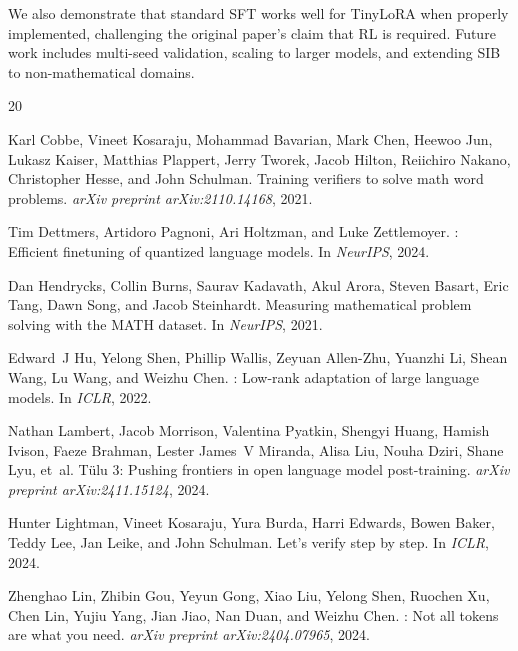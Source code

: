 \documentclass{article}
\begin{document}
We also demonstrate that standard SFT works well for TinyLoRA when properly implemented, challenging the original paper's claim that RL is required. Future work includes multi-seed validation, scaling to larger models, and extending SIB to non-mathematical domains.



\begin{thebibliography}{20}

Karl Cobbe, Vineet Kosaraju, Mohammad Bavarian, Mark Chen, Heewoo Jun, Lukasz Kaiser, Matthias Plappert, Jerry Tworek, Jacob Hilton, Reiichiro Nakano, Christopher Hesse, and John Schulman.
\newblock Training verifiers to solve math word problems.
\newblock \emph{arXiv preprint arXiv:2110.14168}, 2021.

Tim Dettmers, Artidoro Pagnoni, Ari Holtzman, and Luke Zettlemoyer.
: Efficient finetuning of quantized language models.
\newblock In \emph{NeurIPS}, 2024.

Dan Hendrycks, Collin Burns, Saurav Kadavath, Akul Arora, Steven Basart, Eric Tang, Dawn Song, and Jacob Steinhardt.
\newblock Measuring mathematical problem solving with the {MATH} dataset.
\newblock In \emph{NeurIPS}, 2021.

Edward~J Hu, Yelong Shen, Phillip Wallis, Zeyuan Allen-Zhu, Yuanzhi Li, Shean Wang, Lu Wang, and Weizhu Chen.
: Low-rank adaptation of large language models.
\newblock In \emph{ICLR}, 2022.

Nathan Lambert, Jacob Morrison, Valentina Pyatkin, Shengyi Huang, Hamish Ivison, Faeze Brahman, Lester James~V Miranda, Alisa Liu, Nouha Dziri, Shane Lyu, et~al.
\newblock T{\"u}lu 3: Pushing frontiers in open language model post-training.
\newblock \emph{arXiv preprint arXiv:2411.15124}, 2024.

Hunter Lightman, Vineet Kosaraju, Yura Burda, Harri Edwards, Bowen Baker, Teddy Lee, Jan Leike, and John Schulman.
\newblock Let's verify step by step.
\newblock In \emph{ICLR}, 2024.

Zhenghao Lin, Zhibin Gou, Yeyun Gong, Xiao Liu, Yelong Shen, Ruochen Xu, Chen Lin, Yujiu Yang, Jian Jiao, Nan Duan, and Weizhu Chen.
: Not all tokens are what you need.
\newblock \emph{arXiv preprint arXiv:2404.07965}, 2024.


\end{thebibliography}
\end{document}
